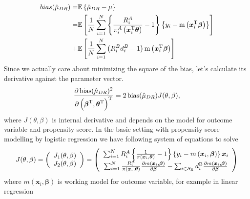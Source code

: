 \documentclass[
  letterpaper,
  DIV=11,
  numbers=noendperiod]{scrreprt}
\begin{document}
\[
\begin{aligned}
bias(\hat{\mu}_{DR}) = & \mathbb{E}\left\{\hat{\mu}_{DR} - \mu\right\} \\ = & \mathbb{E}\left[ \frac{1}{N} \sum_{i=1}^N \left\{\frac{R_i^A}{\pi_i^A \left(\boldsymbol{x}_i^{\mathrm{T}} \boldsymbol{\theta} \right)}  - 1\right\} \left\{y_i - \operatorname{m}\left( \boldsymbol{x}_i^{\mathrm{T}} \boldsymbol{\beta}\right)\right\} \right] \\ + & \mathbb{E}\left[  \frac{1}{N} \sum_{i=1}^N \left(R_i^B d_i^B - 1\right) \operatorname{m}\left( \boldsymbol{x}_i^{\mathrm{T}} \boldsymbol{\beta} \right)\right]
\end{aligned}
\] Since we actually care about minimizing the square of the bias, let's
calculate its derivative against the parameter vector. \[
\begin{aligned}
    \frac{\partial \operatorname{bias}(\hat{\mu}_{DR})^2}{\partial \left(\boldsymbol{\beta}^{\mathrm{T}}, \boldsymbol{\theta}^{\mathrm{T}}\right)^{\mathrm{T}}} = 2 \operatorname{bias}(\hat{\mu}_{DR}) J(\theta, \beta),
\end{aligned}
\] where \(J(\theta, \beta)\) is internal derivative and depends on the
model for outcome variable and propensity score. In the basic setting
with propensity score modelling by logistic regression we have following
system of equations to solve \[
\begin{equation}
\begin{aligned}
J(\theta, \beta)=\left(\begin{array}{c}
J_1(\theta, \beta) \\
J_2(\theta, \beta)
\end{array}\right)=\left(\begin{array}{c}
\sum_{i=1}^N R_i^A\left\{\frac{1}{\pi\left(\boldsymbol{x}_i, \boldsymbol{\theta}\right)}-1\right\}\left\{y_i-m\left(\boldsymbol{x}_i, \boldsymbol{\beta}\right)\right\} \boldsymbol{x}_i \\
\sum_{i=1}^N \frac{R_i^A}{\pi\left(\boldsymbol{x}_i, \boldsymbol{\theta}\right)} \frac{\partial m\left(\boldsymbol{x}_i, \boldsymbol{\beta}\right)}{\partial \bbeta}  - \sum_{i \in \mathcal{S}_{\mathrm{B}}} d_i^{\mathrm{B}} \frac{\partial m\left(\boldsymbol{x}_i, \boldsymbol{\beta}\right)}{\partial \bbeta} 
\end{array}\right)
\end{aligned}
\end{equation}
\] where \(m\left(\boldsymbol{x}_i, \boldsymbol{\beta}\right)\) is
working model for outcome variable, for example in linear regression
\end{document}
